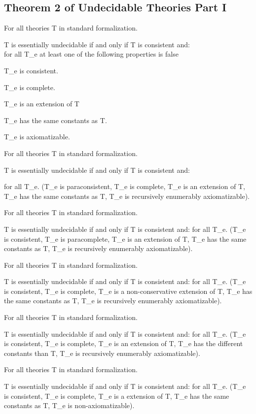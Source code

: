\hypertarget{theorem-2-of-undecidable-theories-part-i}{%
\subsection{Theorem 2 of Undecidable Theories Part
I}\label{theorem-2-of-undecidable-theories-part-i}}

For all theories T in standard formalization.

T is essentially undecidable if and only if T is consistent and:\\
for all T\_e at least one of the following properties is false

T\_e is consistent.

T\_e is complete.

T\_e is an extension of T

T\_e has the same constants as T.

T\_e is axiomatizable.

For all theories T in standard formalization.

T is essentially undecidable if and only if T is consistent and:

for all T\_e. (T\_e is paraconsistent, T\_e is complete, T\_e is an
extension of T, T\_e has the same constants as T, T\_e is recursively
enumerably axiomatizable).

For all theories T in standard formalization.

T is essentially undecidable if and only if T is consistent and: for all
T\_e. (T\_e is consistent, T\_e is paracomplete, T\_e is an extension of
T, T\_e has the same constants as T, T\_e is recursively enumerably
axiomatizable).

For all theories T in standard formalization.

T is essentially undecidable if and only if T is consistent and: for all
T\_e. (T\_e is consistent, T\_e is complete, T\_e is a non-conservative
extension of T, T\_e has the same constants as T, T\_e is recursively
enumerably axiomatizable).

For all theories T in standard formalization.

T is essentially undecidable if and only if T is consistent and: for all
T\_e. (T\_e is consistent, T\_e is complete, T\_e is an extension of T,
T\_e has the different constants than T, T\_e is recursively enumerably
axiomatizable).

For all theories T in standard formalization.

T is essentially undecidable if and only if T is consistent and: for all
T\_e. (T\_e is consistent, T\_e is complete, T\_e is a extension of T,
T\_e has the same constants as T, T\_e is non-axiomatizable).

